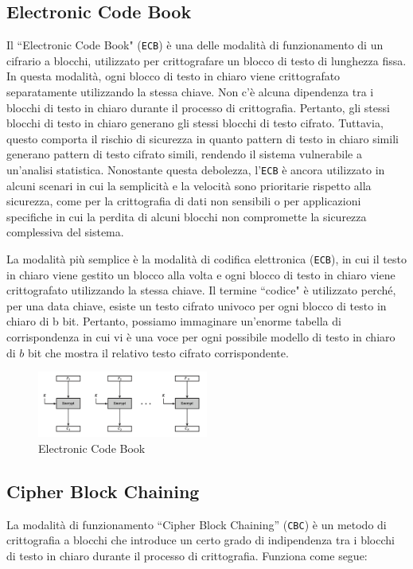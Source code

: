 \subsection{Electronic Code Book}
Il ``Electronic Code Book" (\verb|ECB|) è una
delle modalità di funzionamento di un cifrario a blocchi, utilizzato per
crittografare un blocco di testo di lunghezza fissa. In questa modalità,
ogni blocco di testo in chiaro viene crittografato separatamente utilizzando
la stessa chiave. Non c'è alcuna dipendenza tra i blocchi di testo in chiaro
durante il processo di crittografia. Pertanto, gli stessi blocchi di testo in
chiaro generano gli stessi blocchi di testo cifrato. Tuttavia, questo comporta
il rischio di sicurezza in quanto pattern di testo in chiaro simili generano
pattern di testo cifrato simili, rendendo il sistema vulnerabile a un'analisi
statistica. Nonostante questa debolezza, l'\verb|ECB| è ancora utilizzato in alcuni
scenari in cui la semplicità e la velocità sono prioritarie rispetto alla
sicurezza, come per la crittografia di dati non sensibili o per applicazioni
specifiche in cui la perdita di alcuni blocchi non compromette la sicurezza
complessiva del sistema.

La modalità più semplice è la modalità di codifica elettronica (\verb|ECB|), in cui
il testo in chiaro viene gestito un blocco alla volta e ogni blocco di testo
in chiaro viene crittografato utilizzando la stessa chiave. Il termine ``codice"
è utilizzato perché, per una data chiave, esiste un testo cifrato univoco per
ogni blocco di testo in chiaro di b bit. Pertanto, possiamo immaginare un'enorme
tabella di corrispondenza in cui vi è una voce per ogni possibile modello
di testo in chiaro di $b$ bit che mostra il relativo testo cifrato corrispondente.
\begin{figure}[H]
    \centering
    \includegraphics[width=0.5\textwidth]{img/electriccodeblock.png}
    \caption{Electronic Code Book}
\end{figure}

\subsection{Cipher Block Chaining}

La modalità di funzionamento ``Cipher Block Chaining'' (\verb|CBC|) è un metodo
di crittografia a blocchi che introduce un certo grado di indipendenza tra i
blocchi di testo in chiaro durante il processo di crittografia. Funziona come
segue:

